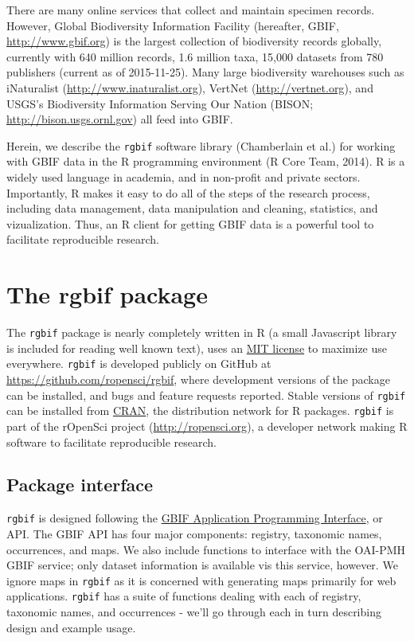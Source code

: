 \documentclass[author-year, review, 11pt]{components/elsarticle} %
\begin{document}
There are many online services that collect and maintain specimen
records. However, Global Biodiversity Information Facility (hereafter,
GBIF, \url{http://www.gbif.org}) is the largest collection of
biodiversity records globally, currently with 640 million records, 1.6
million taxa, 15,000 datasets from 780 publishers (current as of
2015-11-25). Many large biodiversity warehouses such as iNaturalist
(\url{http://www.inaturalist.org}), VertNet (\url{http://vertnet.org}),
and USGS's Biodiversity Information Serving Our Nation (BISON;
\url{http://bison.usgs.ornl.gov}) all feed into GBIF.

Herein, we describe the \texttt{rgbif} software library (Chamberlain et
al.) for working with GBIF data in the R programming environment (R Core
Team, 2014). R is a widely used language in academia, and in non-profit
and private sectors. Importantly, R makes it easy to do all of the steps
of the research process, including data management, data manipulation
and cleaning, statistics, and vizualization. Thus, an R client for
getting GBIF data is a powerful tool to facilitate reproducible
research.

\section{The rgbif package}\label{the-rgbif-package}

The \texttt{rgbif} package is nearly completely written in R (a small
Javascript library is included for reading well known text), uses an
\href{http://choosealicense.com/licenses/mit/}{MIT license} to maximize
use everywhere. \texttt{rgbif} is developed publicly on GitHub at
\href{https://github.com/ropensci/rgbif}{\url{https://github.com/ropensci/rgbif}},
where development versions of the package can be installed, and bugs and
feature requests reported. Stable versions of \texttt{rgbif} can be
installed from
\href{https://cran.rstudio.com/web/packages/rgbif/}{CRAN}, the
distribution network for R packages. \texttt{rgbif} is part of the
rOpenSci project (\url{http://ropensci.org}), a developer network making
R software to facilitate reproducible research.

\subsection{Package interface}\label{package-interface}

\texttt{rgbif} is designed following the
\href{http://www.gbif.org/developer/summary}{GBIF Application
Programming Interface}, or API. The GBIF API has four major components:
registry, taxonomic names, occurrences, and maps. We also include
functions to interface with the OAI-PMH GBIF service; only dataset
information is available vis this service, however. We ignore maps in
\texttt{rgbif} as it is concerned with generating maps primarily for web
applications. \texttt{rgbif} has a suite of functions dealing with each
of registry, taxonomic names, and occurrences - we'll go through each in
turn describing design and example usage.
\end{document}
